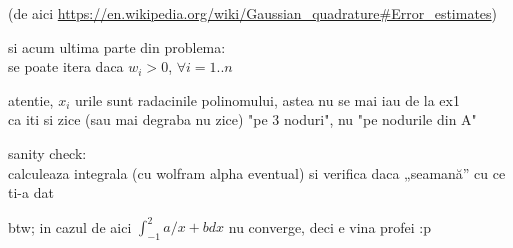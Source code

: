 \documentclass[11pt]{article}
\begin{document}
(de aici
\url{https://en.wikipedia.org/wiki/Gaussian\_quadrature\#Error\_estimates})

\medskip

si acum ultima parte din problema:\\
se poate itera daca \(w_i > 0\), \(\forall i = 1..n\)
\medskip

atentie, \(x_i\) urile sunt radacinile polinomului, astea nu se mai iau de la ex1\\
ca iti si zice (sau mai degraba nu zice) "pe 3 noduri", nu "pe nodurile din A"
\medskip

sanity check:\\
calculeaza integrala (cu wolfram alpha eventual) si verifica daca „seamană” cu ce ti-a dat
\medskip

btw; in cazul de aici \(\int_{-1}^{2} a/x+b dx\) nu converge, deci e vina profei :p
\end{document}
